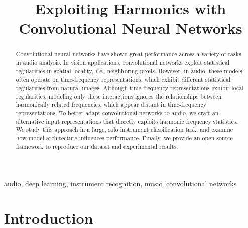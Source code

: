 \documentclass{article}
\title{Exploiting Harmonics with Convolutional Neural Networks}
\def\eg{\emph{e.g.}}
\def\ie{\emph{i.e.}}
\begin{document}
%
\maketitle
%
\begin{abstract}

Convolutional neural networks have shown great performance across a variety of tasks in audio analysis.
In vision applications, convolutional networks exploit statistical regularities in spatial locality, \ie, neighboring pixels.
However, in audio, these models often operate on time-frequency representations, which exhibit different statistical regularities from natural images.
Although time-frequency representations exhibit local regularities, modeling only these interactions ignores the relationships between harmonically related frequencies, which appear distant in time-frequency representations.
To better adapt convolutional networks to audio, we craft an alternative input representations that directly exploits harmonic frequency statistics.
We study this approach in a large, solo instrument classification task, and examine how model architecture influences performance.
Finally, we provide an open source framework to reproduce our dataset and experimental results.
\end{abstract}

\begin{keywords}
    audio, deep learning, instrument recognition, music, convolutional networks
\end{keywords}
\section{Introduction}\label{sec:introduction}

\end{document}

